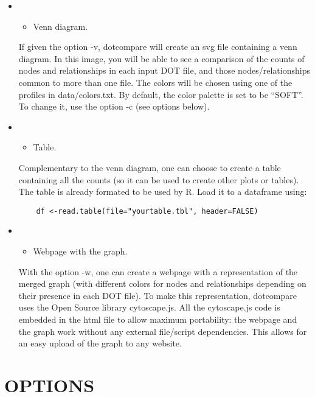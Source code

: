 \documentclass[10pt]{article}
\begin{document}
\begin{itemize}
\item
  \begin{itemize}
  \itemsep1pt\parskip0pt
  \item
    Venn diagram.
  \end{itemize}

  If given the option -v, dotcompare will create an svg file containing
  a venn diagram. In this image, you will be able to see a comparison of
  the counts of nodes and relationships in each input DOT file, and
  those nodes/relationships common to more than one file. The colors
  will be chosen using one of the profiles in data/colors.txt. By
  default, the color palette is set to be ``SOFT''. To change it, use
  the option -c (see options below).
\item
  \begin{itemize}
  \itemsep1pt\parskip0pt
  \item
    Table.
  \end{itemize}

  Complementary to the venn diagram, one can choose to create a table
  containing all the counts (so it can be used to create other plots or
  tables). The table is already formated to be used by R. Load it to a
  dataframe using:

\begin{verbatim}
    df <-read.table(file="yourtable.tbl", header=FALSE)
\end{verbatim}
\item
  \begin{itemize}
  \itemsep1pt\parskip0pt
  \item
    Webpage with the graph.
  \end{itemize}

  With the option -w, one can create a webpage with a representation of
  the merged graph (with different colors for nodes and relationships
  depending on their presence in each DOT file). To make this
  representation, dotcompare uses the Open Source library cytoscape.js.
  All the cytoscape.js code is embedded in the html file to allow
  maximum portability: the webpage and the graph work without any
  external file/script dependencies. This allows for an easy upload of
  the graph to any website.
\end{itemize}

\section{OPTIONS}\label{options}
\end{document}
